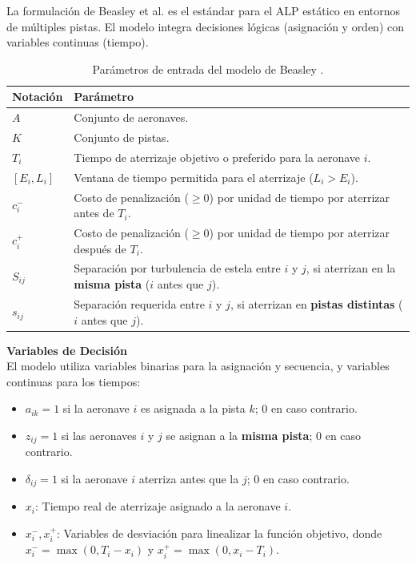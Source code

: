 \documentclass[letter, 10pt]{article}
\begin{document}
La formulaci\'on de Beasley et al. \cite{beasley2000} es el est\'andar para el ALP est\'atico en entornos de m\'ultiples pistas. El modelo integra decisiones l\'ogicas (asignaci\'on y orden) con variables continuas (tiempo).

\begin{table}[htbp]
\centering
\renewcommand{\arraystretch}{1.2}
\begin{tabular}{|l|p{11.5cm}|}
\hline
\textbf{Notaci\'on} & \textbf{Par\'ametro} \\
\hline
$A$ & Conjunto de aeronaves. \\
$K$ & Conjunto de pistas. \\
$T_i$ & Tiempo de aterrizaje objetivo o preferido para la aeronave $i$. \\
$[E_i, L_i]$ & Ventana de tiempo permitida para el aterrizaje ($L_i > E_i$). \\
$c_i^-$ & Costo de penalizaci\'on ($\geq 0$) por unidad de tiempo por aterrizar antes de $T_i$. \\
$c_i^+$ & Costo de penalizaci\'on ($\geq 0$) por unidad de tiempo por aterrizar despu\'es de $T_i$. \\
$S_{ij}$ & Separaci\'on por turbulencia de estela entre $i$ y $j$, si aterrizan en la \textbf{misma pista} ($i$ antes que $j$). \\
$s_{ij}$ & Separaci\'on requerida entre $i$ y $j$, si aterrizan en \textbf{pistas distintas} ($i$ antes que $j$). \\
\hline
\end{tabular}
\caption{Par\'ametros de entrada del modelo de Beasley \cite{beasley2000}.}
\end{table}

\noindent \textbf{Variables de Decisi\'on}\\
El modelo utiliza variables binarias para la asignaci\'on y secuencia, y variables continuas para los tiempos:

\begin{itemize}
    \item $a_{ik} = 1$ si la aeronave $i$ es asignada a la pista $k$; $0$ en caso contrario.
    \item $z_{ij} = 1$ si las aeronaves $i$ y $j$ se asignan a la \textbf{misma pista}; $0$ en caso contrario.
    \item $\delta_{ij} = 1$ si la aeronave $i$ aterriza antes que la $j$; $0$ en caso contrario.
    \item $x_i$: Tiempo real de aterrizaje asignado a la aeronave $i$.
    \item $x_i^-, x_i^+$: Variables de desviaci\'on para linealizar la funci\'on objetivo, donde $x_i^- = \max(0, T_i - x_i)$ y $x_i^+ = \max(0, x_i - T_i)$.
\end{itemize}
\end{document}
